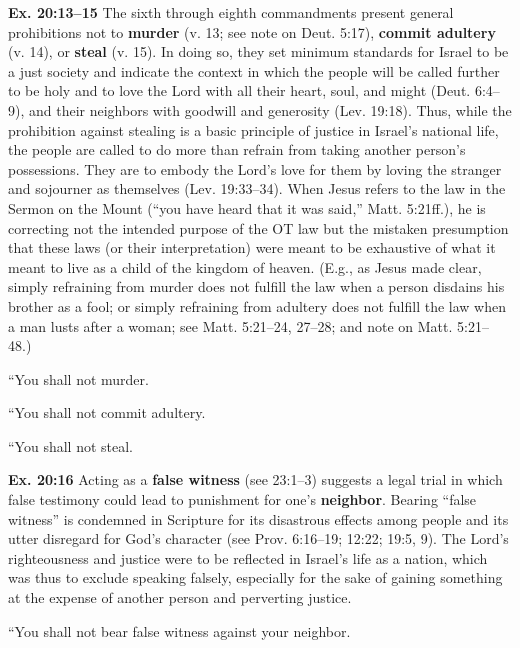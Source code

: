 \documentclass{bible-study-handout}
\begin{document}
\begin{studycommentinline}\textbf{Ex. 20:13–15} The sixth through eighth commandments present general prohibitions not to \textbf{murder} (v. 13; see note on Deut. 5:17), \textbf{commit adultery} (v. 14), or \textbf{steal} (v. 15). In doing so, they set minimum standards for Israel to be a just society and indicate the context in which the people will be called further to be holy and to love the Lord with all their heart, soul, and might (Deut. 6:4–9), and their neighbors with goodwill and generosity (Lev. 19:18). Thus, while the prohibition against stealing is a basic principle of justice in Israel’s national life, the people are called to do more than refrain from taking another person’s possessions. They are to embody the Lord’s love for them by loving the stranger and sojourner as themselves (Lev. 19:33–34). When Jesus refers to the law in the Sermon on the Mount (“you have heard that it was said,” Matt. 5:21ff.), he is correcting not the intended purpose of the OT law but the mistaken presumption that these laws (or their interpretation) were meant to be exhaustive of what it meant to live as a child of the kingdom of heaven. (E.g., as Jesus made clear, simply refraining from murder does not fulfill the law when a person disdains his brother as a fool; or simply refraining from adultery does not fulfill the law when a man lusts after a woman; see Matt. 5:21–24, 27–28; and note on Matt. 5:21–48.)\end{studycommentinline}

“You shall not murder.

“You shall not commit adultery.

“You shall not steal.

\begin{studycomment}\textbf{Ex. 20:16} Acting as a \textbf{false witness} (see 23:1–3) suggests a legal trial in which false testimony could lead to punishment for one’s \textbf{neighbor}. Bearing “false witness” is condemned in Scripture for its disastrous effects among people and its utter disregard for God’s character (see Prov. 6:16–19; 12:22; 19:5, 9). The Lord’s righteousness and justice were to be reflected in Israel’s life as a nation, which was thus to exclude speaking falsely, especially for the sake of gaining something at the expense of another person and perverting justice.\end{studycomment}“You shall not bear false witness against your neighbor.
\end{document}

